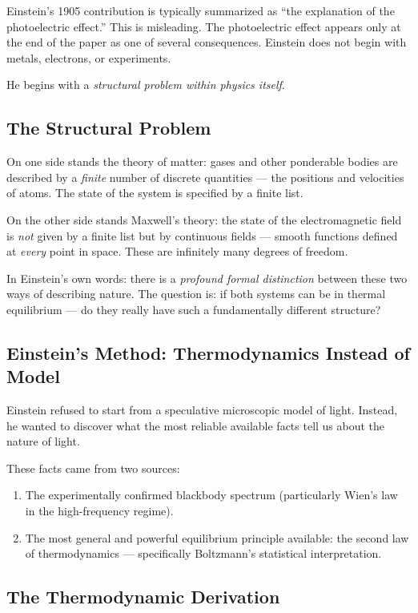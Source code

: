 Einstein's 1905 contribution is typically summarized as ``the explanation of the 
photoelectric effect.'' This is misleading. The photoelectric effect appears only at 
the end of the paper as one of several consequences. Einstein does not begin with 
metals, electrons, or experiments.

He begins with a \emph{structural problem within physics itself}.

\subsection{The Structural Problem}

On one side stands the theory of matter: gases and other ponderable bodies are 
described by a \emph{finite} number of discrete quantities — the positions and 
velocities of atoms. The state of the system is specified by a finite list.

On the other side stands Maxwell's theory: the state of the electromagnetic field 
is \emph{not} given by a finite list but by continuous fields — smooth functions 
defined at \emph{every} point in space. These are infinitely many degrees of freedom.

In Einstein's own words: there is a \emph{profound formal distinction} between 
these two ways of describing nature. The question is: if both systems can be in 
thermal equilibrium — do they really have such a fundamentally different structure?

\subsection{Einstein's Method: Thermodynamics Instead of Model}

Einstein refused to start from a speculative microscopic model of light. Instead, 
he wanted to discover what the most reliable available facts tell us about the 
nature of light.

These facts came from two sources:
\begin{enumerate}
    \item The experimentally confirmed blackbody spectrum (particularly Wien's law 
    in the high-frequency regime).
    \item The most general and powerful equilibrium principle available: the second 
    law of thermodynamics — specifically Boltzmann's statistical interpretation.
\end{enumerate}

\subsection{The Thermodynamic Derivation}

